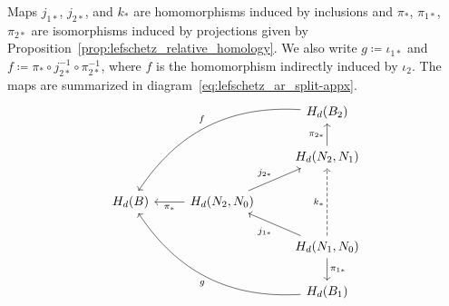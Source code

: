 \documentclass[letterpaper,11pt]{article}
\theoremstyle{plain}
\theoremstyle{definition}
\newcounter{li}
\newcommand{\lmap}[1]{\iota_{#1}}
\newcommand{\lmapx}[1]{\iota_{#1\ast}}
\newcommand{\imapx}[1]{j_{#1\ast}}
\newcommand{\projmapx}[1]{\pi_{#1\ast}}
\begin{document}
{Maps $\imapx{1}$, $\imapx{2}$, and $k_\ast$ are homomorphisms induced by inclusions
    and $\projmapx{}$, $\projmapx{1}$, $\projmapx{2}$ are isomorphisms induced by projections given by Proposition~\ref{prop:lefschetz_relative_homology}.
We also write $g\coloneqq\lmapx{1}$ and 
    $f\coloneqq \projmapx{}\circ\imapx{2}^{-1}\circ\projmapx{2}^{-1}$, where $f$ is the homomorphism indirectly induced by $\lmap{2}$.
The maps are summarized in diagram~\eqref{eq:lefschetz_ar_split-appx}.
\begin{equation}\label{eq:lefschetz_ar_split-appx}
    \begin{tikzcd}%
        & & H_d(B_2)\arrow[lldd, bend right, "f", swap]\\
        & & H_d(N_2, N_1)\arrow[u,"\projmapx{2}"]\\ 
        H_d(B) & H_d(N_2,N_0)\arrow[l,"\projmapx{}"]\arrow[ru, "\imapx{2}"] &\\
        & & H_d(N_1,N_0)\arrow[d,"\projmapx{1}"]\arrow[lu, "\imapx{1}"]\arrow[uu, "k_\ast", dashed]\\
        & & H_d(B_1)\arrow[lluu, bend left, "g"]
    \end{tikzcd}
\end{equation}

}
\end{document}
